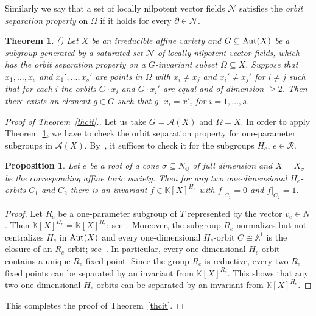 \documentclass[12pt,a4paper]{amsart}
\theoremstyle{plain}
\newtheorem{theorem}{Theorem}
\newtheorem{proposition}{Proposition}
\theoremstyle{definition}
\begin{document}
Similarly we say that a set of locally nilpotent vector fields ${{\mathcal{N}}}$
satisfies the {\it orbit separation property} on $\Omega$ if it holds
for every $\partial\in{{\mathcal{N}}}$.

\begin{theorem} (\cite[Theorem~3.1]{AFKKZ}) \label{thAFKKZ}
Let $X$ be an irreducible affine variety and
$G\subseteq{\mathop{\rm Aut}}(X)$ be a subgroup
generated by a saturated set ${{\mathcal{N}}}$ of locally nilpotent vector
fields, which has the orbit separation property on a $G$-invariant
subset $\Omega\subseteq X$. Suppose that $x_1,\ldots ,x_s$ and
$x_1',\ldots, x_s'$ are points in $\Omega$ with $x_i\ne x_j$ and
$x_i'\ne x_j'$ for $i\ne j$ such that for each $i$ the orbits
$G\cdot x_i$ and $G\cdot x_i'$ are equal and of dimension $\ge 2$. Then
there exists an element $g\in G$ such that $g\cdot x_i=x'_i$ for
$i=1,\ldots, s$.
\end{theorem}

\begin{proof}[Proof of Theorem~\ref{thcit}.]
Let us take $G={{\mathcal{A}}}(X)$ and $\Omega=X$. In order to apply Theorem~\ref{thAFKKZ},
we have to check the
orbit separation property for one-parameter subgroups in ${{\mathcal{A}}}(X)$.
By~\cite[Lemma~2.8]{AFKKZ}, it suffices to check it for the subgroups
$H_e$, $e\in\mathcal{R}$.

\begin{proposition}
Let $e$ be a root of a cone $\sigma\subseteq N_{{\mathbb Q}}$ of full dimension
and $X=X_{\sigma}$ be the corresponding affine toric variety. Then for any
two one-dimensional $H_e$-orbits $C_1$ and $C_2$ there is an invariant
$f\in{{\mathbb K}}[X]^{H_e}$ with $f|_{C_1} =0$ and $f|_{C_2} =1$.
\end{proposition}

\begin{proof}
Let $R_e$ be a one-parameter subgroup of $T$ represented by the vector
$v_e\in N$. Then ${{\mathbb K}}[X]^{H_e}={{\mathbb K}}[X]^{R_e}$; see~\cite[Section~2.4]{AKZ}.
Moreover, the subgroup $R_e$ normalizes but not centralizes $H_e$ in ${\mathop{\rm Aut}}(X)$
and every one-dimensional $H_e$-orbit $C\cong{{\mathbb A}}^1$ is the closure of an $R_e$-orbit;
see~\cite[Proposition~2.1]{AKZ}. In particular, every one-dimensional $H_e$-orbit
contains a unique $R_e$-fixed point. Since the group $R_e$ is reductive, every two $R_e$-fixed
points can be separated by an invariant from ${{\mathbb K}}[X]^{R_e}$. This shows that any two
one-dimensional $H_e$-orbits can be separated by an invariant from ${{\mathbb K}}[X]^{H_e}$.
\end{proof}

This completes the proof of Theorem~\ref{thcit}.
\end{proof}
\end{document}
